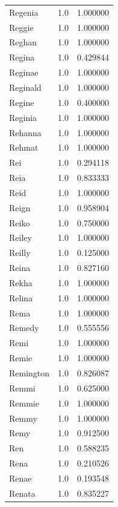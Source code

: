 \documentclass[
  letterpaper,
  DIV=11,
  numbers=noendperiod]{scrreprt}
\begin{document}
\begin{tabular}{lrr}
Regenia         &   1.0 &   1.000000 \\
Reggie          &   1.0 &   1.000000 \\
Reghan          &   1.0 &   1.000000 \\
Regina          &   1.0 &   0.429844 \\
Reginae         &   1.0 &   1.000000 \\
Reginald        &   1.0 &   1.000000 \\
Regine          &   1.0 &   0.400000 \\
Reginia         &   1.0 &   1.000000 \\
Rehanna         &   1.0 &   1.000000 \\
Rehmat          &   1.0 &   1.000000 \\
Rei             &   1.0 &   0.294118 \\
Reia            &   1.0 &   0.833333 \\
Reid            &   1.0 &   1.000000 \\
Reign           &   1.0 &   0.958904 \\
Reiko           &   1.0 &   0.750000 \\
Reiley          &   1.0 &   1.000000 \\
Reilly          &   1.0 &   0.125000 \\
Reina           &   1.0 &   0.827160 \\
Rekha           &   1.0 &   1.000000 \\
Relina          &   1.0 &   1.000000 \\
Rema            &   1.0 &   1.000000 \\
Remedy          &   1.0 &   0.555556 \\
Remi            &   1.0 &   1.000000 \\
Remie           &   1.0 &   1.000000 \\
Remington       &   1.0 &   0.826087 \\
Remmi           &   1.0 &   0.625000 \\
Remmie          &   1.0 &   1.000000 \\
Remmy           &   1.0 &   1.000000 \\
Remy            &   1.0 &   0.912500 \\
Ren             &   1.0 &   0.588235 \\
Rena            &   1.0 &   0.210526 \\
Renae           &   1.0 &   0.193548 \\
Renata          &   1.0 &   0.835227 \\

\end{tabular}
\end{document}
